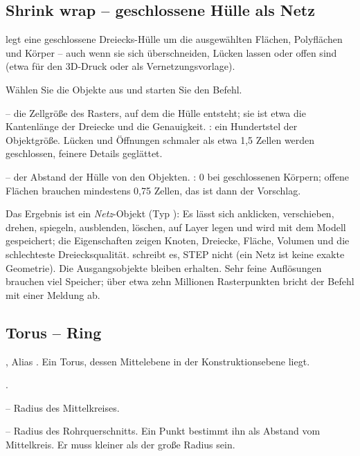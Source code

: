 \subsection{Shrink wrap -- geschlossene Hülle als Netz}\label{sec:cmd-shrinkwrap}
 legt eine geschlossene Dreiecks-Hülle um die ausgewählten Flächen, Polyflächen und
Körper -- auch wenn sie sich überschneiden, Lücken lassen oder offen sind (etwa für den 3D-Druck
oder als Vernetzungsvorlage).
\begin{schritte}
\item Wählen Sie die Objekte aus und starten Sie den Befehl.
\item {} -- die Zellgröße des Rasters, auf dem die Hülle entsteht;
  sie ist etwa die Kantenlänge der Dreiecke und die Genauigkeit. : ein Hundertstel der
  Objektgröße. Lücken und Öffnungen schmaler als etwa 1,5 Zellen werden geschlossen, feinere
  Details geglättet.
\item {} -- der Abstand der Hülle von den Objekten.
  : 0 bei geschlossenen Körpern; offene Flächen brauchen mindestens 0,75 Zellen, das
  ist dann der Vorschlag.
\end{schritte}
Das Ergebnis ist ein \emph{Netz}-Objekt (Typ ): Es lässt sich anklicken, verschieben,
drehen, spiegeln, ausblenden, löschen, auf Layer legen und wird mit dem Modell gespeichert; die
Eigenschaften zeigen Knoten, Dreiecke, Fläche, Volumen und die schlechteste Dreiecksqualität.
 schreibt es, STEP nicht (ein Netz ist keine exakte Geometrie). Die
Ausgangsobjekte bleiben erhalten. Sehr feine Auflösungen brauchen viel Speicher; über etwa
zehn Millionen Rasterpunkten bricht der Befehl mit einer Meldung ab.

\subsection{Torus -- Ring}\label{sec:cmd-torus}
, Alias . Ein Torus, dessen Mittelebene in der Konstruktionsebene liegt.
\begin{schritte}
\item {}.
\item {} -- Radius des Mittelkreises.
\item {} -- Radius des Rohrquerschnitts. Ein Punkt
  bestimmt ihn als Abstand vom Mittelkreis. Er muss kleiner als der große Radius sein.
\end{schritte}

